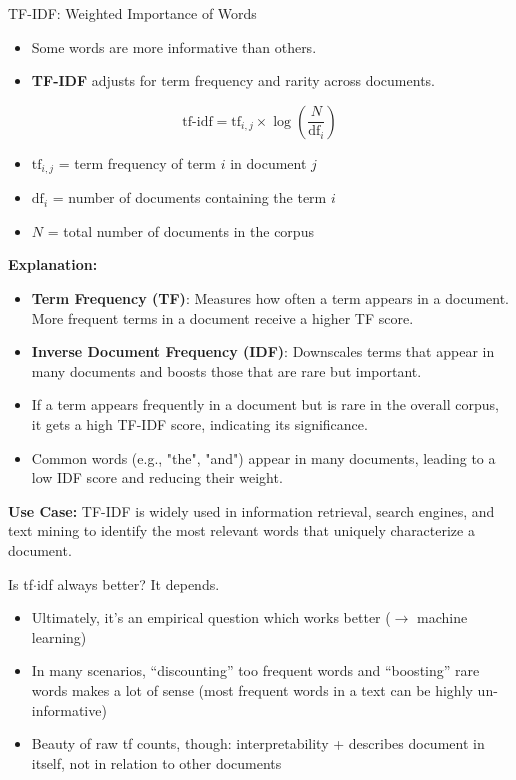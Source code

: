 \documentclass[handout]{beamer}
\begin{document}
\begin{frame}{TF-IDF: Weighted Importance of Words}
\begin{itemize}
    \item Some words are more informative than others.
    \item \textbf{TF-IDF} adjusts for term frequency and rarity across documents.
\end{itemize}

\[
\text{tf-idf} = \text{tf}_{i,j} \times \log \left(\frac{N}{\text{df}_i}\right)
\]

\begin{itemize}
    \item \( \text{tf}_{i,j} \) = term frequency of term \( i \) in document \( j \)
    \item \( \text{df}_i \) = number of documents containing the term \( i \)
    \item \( N \) = total number of documents in the corpus
\end{itemize}

\vspace{0.5cm}
\textbf{Explanation:}
\begin{itemize}
    \item \textbf{Term Frequency (TF)}: Measures how often a term appears in a document. More frequent terms in a document receive a higher TF score.
    \item \textbf{Inverse Document Frequency (IDF)}: Downscales terms that appear in many documents and boosts those that are rare but important.
    \item If a term appears frequently in a document but is rare in the overall corpus, it gets a high TF-IDF score, indicating its significance.
    \item Common words (e.g., "the", "and") appear in many documents, leading to a low IDF score and reducing their weight.
\end{itemize}

\textbf{Use Case:}  
TF-IDF is widely used in information retrieval, search engines, and text mining to identify the most relevant words that uniquely characterize a document.
\end{frame}


\begin{frame}{Is tf$\cdot$idf always better?}
	It depends.
	
	\begin{itemize}
		\item Ultimately, it's an empirical question which works better ($\rightarrow$ machine learning)
		\item In many scenarios,  ``discounting'' too frequent words and ``boosting'' rare words makes a lot of sense (most frequent words in a text can be highly un-informative)
		\item Beauty of raw tf counts, though: interpretability + describes document in itself, not in relation to other documents
	\end{itemize}
\end{frame}
\end{document}
